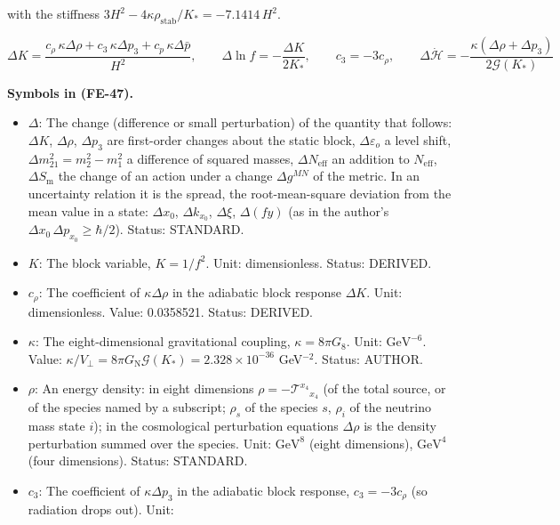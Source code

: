 \documentclass[
  10pt,
]{article}
\providecommand{\tightlist}{%
  \setlength{\itemsep}{0pt}\setlength{\parskip}{0pt}}
\begin{document}
with the stiffness
\(3H^2 - 4\kappa\rho_{\mathrm{stab}}/K_* = -7.1414\,H^2\).

\[
\Delta K = \frac{c_\rho\,\kappa\Delta\rho + c_3\,\kappa\Delta p_3 + c_p\,\kappa\Delta\bar p}{H^2},\qquad
\Delta\ln f = -\frac{\Delta K}{2K_*},\qquad c_3 = -3c_\rho,\qquad
\Delta\dot{\mathcal{H}} = -\frac{\kappa(\Delta\rho + \Delta p_3)}{2\mathcal{G}(K_*)} \tag{FE-47}
\]

\textbf{Symbols in (FE-47).}

\begin{itemize}
\tightlist
\item
  \(\Delta\): The change (difference or small perturbation) of the
  quantity that follows: \(\Delta K\), \(\Delta\rho\), \(\Delta p_3\)
  are first-order changes about the static block,
  \(\Delta\varepsilon_o\) a level shift,
  \(\Delta m^2_{21} = m_2^2 - m_1^2\) a difference of squared masses,
  \(\Delta N_{\mathrm{eff}}\) an addition to \(N_{\mathrm{eff}}\),
  \(\Delta S_{\mathrm{m}}\) the change of an action under a change
  \(\Delta g^{MN}\) of the metric. In an uncertainty relation it is the
  spread, the root-mean-square deviation from the mean value in a state:
  \(\Delta x_0\), \(\Delta k_{x_0}\), \(\Delta\xi\), \(\Delta(fy)\) (as
  in the author's \(\Delta x_0\,\Delta p_{x_0} \ge \hbar/2\)). Status:
  STANDARD.
\item
  \(K\): The block variable, \(K = 1/f^2\). Unit: dimensionless. Status:
  DERIVED.
\item
  \(c_\rho\): The coefficient of \(\kappa\Delta\rho\) in the adiabatic
  block response \(\Delta K\). Unit: dimensionless. Value: 0.0358521.
  Status: DERIVED.
\item
  \(\kappa\): The eight-dimensional gravitational coupling,
  \(\kappa = 8\pi G_8\). Unit: \(\mathrm{GeV}^{-6}\). Value:
  \(\kappa/V_\perp = 8\pi G_{\mathrm{N}}\mathcal{G}(K_*) = 2.328\times10^{-36}\)
  GeV\(^{-2}\). Status: AUTHOR.
\item
  \(\rho\): An energy density: in eight dimensions
  \(\rho = -\mathcal{T}^{x_4}{}_{x_4}\) (of the total source, or of the
  species named by a subscript; \(\rho_s\) of the species \(s\),
  \(\rho_i\) of the neutrino mass state \(i\)); in the cosmological
  perturbation equations \(\Delta\rho\) is the density perturbation
  summed over the species. Unit: \(\mathrm{GeV}^{8}\) (eight
  dimensions), \(\mathrm{GeV}^{4}\) (four dimensions). Status: STANDARD.
\item
  \(c_3\): The coefficient of \(\kappa\Delta p_3\) in the adiabatic
  block response, \(c_3 = -3c_\rho\) (so radiation drops out). Unit:

\end{itemize}
\end{document}
